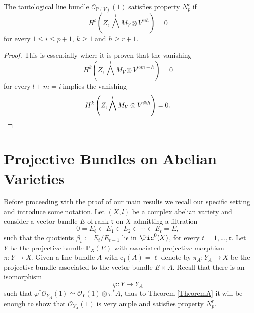\documentclass[11pt,letter]{amsart}
\numberwithin{equation}{section}
\begin{document}
\begin{prop}\label{PARK}
    The tautological line bundle $\mathcal{O}_{\mathbb{P}(V)}(1)$ satisfies property $N_p^r$
 if 
 \[H^k\left(Z,\bigwedge^iM_V\otimes V^{\otimes h}\right)=0\]
 for every $1\leq i\leq p+1 $, $k\geq 1$ and $h\geq r+1.$
 \end{prop}
 \begin{proof}
     This is essentially \cite[Prop. 3.2]{Park} where  it is proven that the vanishing 
      \[H^k\left(Z,\bigwedge^lM_V\otimes V^{\otimes m+h}\right)=0\]
      for every $l+m=i$ implies the vanishing
       \[H^k\left(Z,\bigwedge^iM_V\otimes V^{\otimes h}\right)=0. \qedhere\]
 \end{proof}
\section{Projective Bundles on Abelian Varieties}\label{sec4}
Before proceeding with the proof of our main results we recall our specific setting and introduce some notation. Let $(X,l)$ be a complex abelian variety and consider a vector bundle $E$ of rank $\mathfrak{r}$ on $X$ admitting a filtration
\begin{equation}\label{eq:filtration}
    0=E_0\subset E_1\subset E_2\subset\cdots\subset E_\mathfrak{r}=E,
\end{equation}
such that the quotients
$\beta_t:=E_t/E_{t-1}$ lie in $\Pic^0(X)$, for every $t=1,\ldots,\mathfrak{r}$.
Let $Y$ be the projective bundle $\mathbb{P}_X(E)$ with associated projective morphism $\pi:Y\rightarrow X$. Given a line bundle $A$ with $\mathrm{c}_1(A)=\ell$ denote by $\pi_A:Y_A\rightarrow X$ be the projective bundle associated to the vector bundle $E\times A$. Recall that there is an isomorphism 
\[\varphi:Y \rightarrow Y_A\]
such that $\varphi^*\mathcal{O}_{Y_A}(1)\simeq \mathcal{O}_{Y}(1)\otimes \pi^*A$, thus to Theorem \ref{TheoremA} it will be enough to show that $\mathcal{O}_{Y_A}(1)$ is very ample and satisfies property $N_p^r$. 
\end{document}
